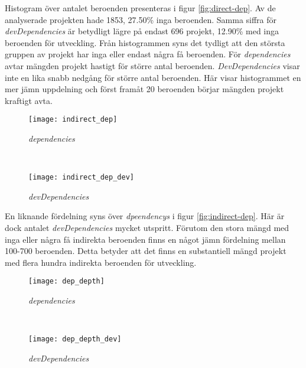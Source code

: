 Histogram över antalet beroenden presenteras i figur \ref{fig:direct-dep}. Av de analyserade projekten hade 1853, 27.50\% inga beroenden. Samma siffra för \textit{devDependencies} är betydligt lägre på endast 696 projekt, 12.90\% med inga beroenden för utveckling. Från histogrammen syns det tydligt att den största gruppen av projekt har inga eller endast några få beroenden. För \textit{dependencies} avtar mängden projekt hastigt för större antal beroenden. \textit{DevDependencies} visar inte en lika snabb nedgång för större antal beroenden. Här visar histogrammet en mer jämn uppdelning och först framåt 20 beroenden börjar mängden projekt kraftigt avta.

\begin{figure*}[]
    \centering
    \begin{subfigure}[]{0.5\textwidth}
        \centering
        \texttt{[image: indirect\_dep]}
        \caption{\textit{dependencies}}
    \end{subfigure}%
    ~
    \begin{subfigure}[]{0.5\textwidth}
        \centering
        \texttt{[image: indirect\_dep\_dev]}
        \caption{\textit{devDependencies}}
    \end{subfigure}
    \caption{Histogram över projekt med maximalt 1800 indirekta beroenden}
    \label{fig:indirect-dep}
\end{figure*}

En liknande fördelning syns över \textit{dpeendencys} i figur \ref{fig:indirect-dep}. Här är dock antalet \textit{devDependencies} mycket utspritt. Förutom den stora mängd med inga eller några få indirekta beroenden finns en något jämn fördelning mellan 100-700 beroenden. Detta betyder att det finns en substantiell mängd projekt med flera hundra indirekta beroenden för utveckling.

\begin{figure*}[]
    \centering
    \begin{subfigure}[]{0.5\textwidth}
        \centering
        \texttt{[image: dep\_depth]}
        \caption{\textit{dependencies}}
        \label{fig:dep-depth-dependencies}
    \end{subfigure}%
    ~
    \begin{subfigure}[]{0.5\textwidth}
        \centering
        \texttt{[image: dep\_depth\_dev]}
        \caption{\textit{devDependencies}}
        \label{fig:dep-depth-devDependencies}
      \end{subfigure}
    \caption{Histogram över projektens beroendedjup}
    \label{fig:dep-depth}
\end{figure*}

